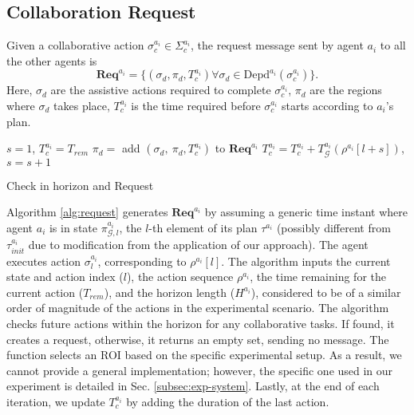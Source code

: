 \subsection{Collaboration Request}\label{subsec:res-request}
 Given a collaborative action $\sigma^{a_i}_c\in\Sigma^{a_i}_c$, the request message sent by agent $a_i$ to all the other agents is
    \begin{equation*}
    \mathbf{Req}^{a_i}=\{(\sigma_d, \pi_{d}, T^{a_i}_c) \forall \sigma_d\in\mathrm{Depd}^{a_i}(\sigma^{a_i}_c)\}.
    \end{equation*}
Here, $\sigma_d$ are the assistive actions required to complete $\sigma^{a_i}_c$, $\pi_{d}$ are the regions where $\sigma_d$ takes place, $T^{a_i}_c$ is the time required before $\sigma^{a_i}_c$ starts according to $a_i$'s plan.
\begin{algorithm2e}[t]
\DontPrintSemicolon
{}

\BlankLine
$s=1$, $T^{a_i}_c=T_{rem}$\;
{   
    {
        {
            $\pi_d=$\ChooseROI{}\;
            add $(\sigma_d,\ \pi_d, T^{a_i}_c)$ to $\mathbf{Req}^{a_i}$\;            
        } 
    }
    $T^{a_i}_c = T^{a_i}_c + T^{a_i}_{\mathcal{G}}(\rho^{a_i}[l+s])$, $s=s+1$\;
}
\Return{$\emptyset$}
\caption{Check in horizon and Request}\label{alg:request}
\end{algorithm2e}
Algorithm \ref{alg:request} generates $\mathbf{Req}^{a_i}$ by assuming a generic time instant where agent $a_i$ is in state $\pi^{a_i}_{\mathcal{G}, l}$, the $l$-th element of its plan $\tau^{a_i}$ (possibly different from $\tau^{a_i}_{init}$ due to modification from the application of our approach). The agent executes action $\sigma^{a_i}_l$, corresponding to $\rho^{a_i}[l]$. The algorithm inputs the current state and action index ($l$), the action sequence $\rho^{a_i}$, the time remaining for the current action ($T_{rem}$), and the horizon length ($H^{a_i}$), considered to be of a similar order of magnitude of the actions in the experimental scenario. The algorithm checks future actions within the horizon for any collaborative tasks. If found, it creates a request, otherwise, it returns an empty set, sending no message.  
The \ChooseROI function selects an ROI based on the specific experimental setup. As a result, we cannot provide a general implementation; however, the specific one used in our experiment is detailed in Sec. \ref{subsec:exp-system}. Lastly, at the end of each iteration, we update $T^{a_i}_c$ by adding the duration of the last action.
